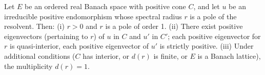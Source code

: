 Let $E$ be an ordered real Banach space with positive cone $C$, and let $u$ be an irreducible positive endomorphism whose spectral radius $r$ is a pole of the resolvent. Then: (i) $r > 0$ and $r$ is a pole of order 1. (ii) There exist positive eigenvectors (pertaining to $r$) of $u$ in $C$ and $u'$ in $C'$; each positive eigenvector for $r$ is quasi-interior, each positive eigenvector of $u'$ is strictly positive. (iii) Under additional conditions ($C$ has interior, or $d(r)$ is finite, or $E$ is a Banach lattice), the multiplicity $d(r) = 1$.
